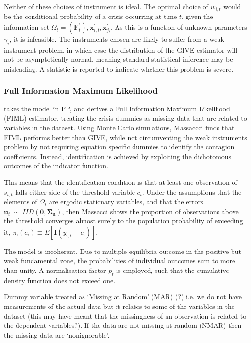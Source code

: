 \documentclass[../base.tex]{subfiles}
\begin{document}
Neither of these choices of instrument is ideal. The optimal choice of $w_{i,t}$ would be the conditional probability of a crisis occurring at time $t$, given the information set $\Omega_t = (\mathbf{F}_t^\prime), \mathbf{x}_{i,t}^{\prime}, \mathbf{x}_{j_t}^{\prime}$. As this is a function of unknown parameters $\gamma_i$, it is infeasible. The instruments chosen are likely to suffer from a weak instrument problem, in which case the distribution of the GIVE estimator will not be asymptotically normal, meaning standard statistical inference may be misleading. A \cite{cragg1993testing} statistic is reported to indicate whether this problem is severe. 

\subsubsection{Full Information Maximum Likelihood}

\cite{massacci2007identification} takes the model in PP, and derives a Full Information Maximum Likelihood (FIML) estimator, treating the crisis dummies as missing data that are related to variables in the dataset. Using Monte Carlo simulations, Massaccci finds that FIML performs better than GIVE, while not circumventing the weak instruments problem by not requiring equation specific dummies to identify the contagion coefficients. Instead, identification is achieved by exploiting the dichotomous outcomes of the indicator function. 

This means that the identification condition is that at least one observation of $s_{i,t}$ falls either side of the threshold variable $c_i$. Under the assumptions that the elements of $\Omega_t$ are ergodic stationary variables, and that the errors $\mathbf{u}_t~\sim~IID(\mathbf{0}, \mathbf{\Sigma_u})$, then Massacci shows the proportion of observations above the threshold converges almost surely to the population probability of exceeding it, $\pi_i (c_i) \equiv \mathit{E}[\mathbf{I}(y_{i,t} -c_i)]$.

The model is incoherent. Due to multiple equilibria outcome in the positive but weak fundamental zone, the probabilities of individual outcomes sum to more than unity. A normalisation factor $p_t$ is employed, such that the cumulative density function does not exceed one. 

 

Dummy variable treated as `Missing at Random' (MAR) (?) i.e. we do not have measurements of the actual data but it relates to some of the variables in the dataset (this may have meant that the missingness of an observation is related to the dependent variables?). If the data are not missing at random (NMAR) then the missing data are `nonignorable'. 
\end{document}
